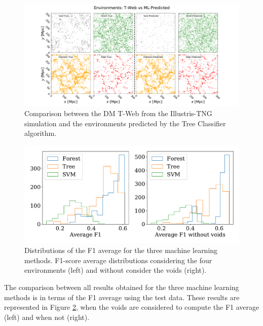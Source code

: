 \documentclass[usenatbib]{mnras}
\begin{document}
\begin{figure}
  \centering 
    \includegraphics[scale=0.3]{Figs/p_environment_predicted.pdf}
    \caption{Comparison between the DM T-Web from the Illustris-TNG
      simulation and the environments predicted by the Tree Classifier
      algorithm.} 
    \label{fig:prediction}
\end{figure}

\begin{figure}
    \includegraphics[scale=0.55]{Figs/p_hist_f1.pdf}
    \caption{Distributions of the F1 average for the three machine
      learning methods. F1-score average distributions considering the
      four environments (left) and without consider the voids
      (right).} 
    \label{fig:methods}
\end{figure}

The comparison between all results obtained for the three machine
learning methods is in terms of the F1 average using the test data. These results
are represented in Figure \ref{fig:methods}, when the voids are
considered to compute the F1 average (left) and when not (right). 
\end{document}
